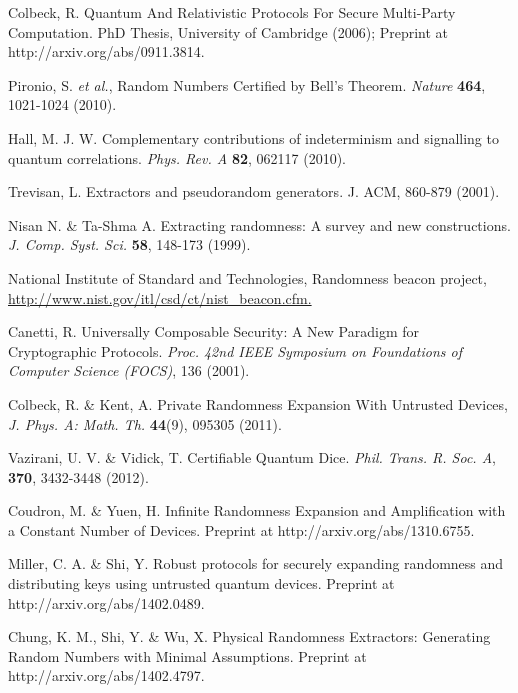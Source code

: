\documentclass[11pt,a4paper]{article}
\begin{document}
{\begin{thebibliography}{99}
Colbeck, R. Quantum And Relativistic Protocols For Secure
Multi-Party Computation. PhD Thesis, University of Cambridge
(2006); Preprint at http://arxiv.org/abs/0911.3814.

Pironio, S. {\em et al.},
Random Numbers Certified by Bell's Theorem. \textit{Nature} \textbf{464}, 1021-1024 (2010).

Hall, M. J. W. Complementary contributions of indeterminism and signalling to quantum correlations.
\textit{Phys. Rev. A} \textbf{82}, 062117 (2010).

Trevisan, L. Extractors and pseudorandom generators. J. ACM,
860-879 (2001).

Nisan N. \& Ta-Shma A.  Extracting randomness:
A survey and new constructions. \textit{J. Comp. Syst. Sci.} \textbf{58},
148-173 (1999).

 National Institute of Standard and Technologies, Randomness beacon project,
\url{http://www.nist.gov/itl/csd/ct/nist_beacon.cfm.}

Canetti, R. Universally Composable Security: A New Paradigm for
Cryptographic Protocols. \textit{Proc. 42nd IEEE Symposium on Foundations
of Computer Science (FOCS)}, 136 (2001).

Colbeck, R. \& Kent, A. Private Randomness Expansion With
Untrusted Devices, \textit{J. Phys. A: Math. Th.} \textbf{44}(9), 095305
(2011).

Vazirani, U. V. \& Vidick, T. Certifiable Quantum Dice.
\textit{Phil. Trans. R. Soc. A}, \textbf{370}, 3432-3448
(2012).

Coudron, M. \& Yuen, H. Infinite Randomness Expansion and Amplification with a Constant Number of Devices. Preprint at http://arxiv.org/abs/1310.6755.

Miller, C. A. \& Shi, Y. Robust protocols for securely expanding randomness and distributing keys using untrusted quantum devices. Preprint at http://arxiv.org/abs/1402.0489.

Chung, K. M., Shi, Y. \& Wu, X. Physical Randomness Extractors: Generating Random Numbers with Minimal Assumptions. Preprint at http://arxiv.org/abs/1402.4797.



\end{thebibliography}}
\end{document}
